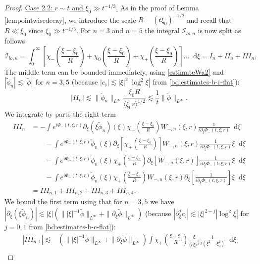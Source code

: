 \documentclass[11 pt]{amsart}
\theoremstyle{definition}
\theoremstyle{remark}
\numberwithin{equation}{section}
\newcommand{\dd}{\mathop{}\!\mathrm{d}}
\begin{document}
\begin{proof}
\noindent \underline{Case 2.2: $r \sim t$ and $\xi_0 \gg t^{-1/3}$.} As in the proof of Lemma \ref{lempointwisedecay}, we introduce the scale $R = (t \xi_0)^{-1/2}$ and recall that $R \ll \xi_0$ since $\xi_0 \gg t^{-1/3}$. For $n=3$ and $n=5$ the integral $\mathcal{I}_{lo,n}$ is now split as follows
\begin{equation} \label{decomposition-mathcalI-lon}
\mathcal{I}_{lo,n} = \int_0^\infty \left[ \chi_-\left( \frac{\xi - \xi_0}{R} \right) + \chi_0\left( \frac{\xi - \xi_0}{R} \right) + \chi_+\left( \frac{\xi - \xi_0}{R} \right)\right] \dots \dd \xi = I_n + II_n + III_n,
\end{equation}
The middle term can be bounded immediately, using \eqref{estimateWa2} and $|\tilde \phi_n|\lesssim |\tilde \phi|$ for $n=3,5$ (because $|c_{\flat}|\lesssim |\xi|^2|\log^2\xi|$ from \eqref{bd:estimates-b-c-flat}):
$$
|II_n| \lesssim  \| \widetilde{\phi}_n \|_{L^\infty} \frac{\xi_0 R}{\langle \xi_0 r \rangle^{1/2}} \lesssim \frac 1t  \|  \widetilde{\phi} \|_{L^\infty} .
$$
We integrate by parts the right-term
\begin{align*}
III_n & = - \int e^{i \Phi_-(t,\xi,r)} \partial_\xi (\xi \widetilde{\phi}_n)(\xi) \chi_+\left( \frac{\xi - \xi_0}{R} \right) W_{-,n}(\xi,r) \frac{1}{i \partial_\xi \Phi_-(t,\xi,r)} \dd \xi \\
&\qquad  - \int e^{i \Phi_-(t,\xi,r)} \widetilde{\phi}_n(\xi)\partial_\xi \left[  \chi_+\left( \frac{\xi - \xi_0}{R} \right) \right] W_{-,n}(\xi,r) \frac{1}{i \partial_\xi \Phi_-(t,\xi,r)} \xi \dd \xi \\
& \qquad -  \int e^{i \Phi_-(t,\xi,r)} \widetilde{\phi}_n(\xi)  \chi_+\left( \frac{\xi - \xi_0}{R} \right) \partial_\xi \left[ W_{-,n}(\xi,r) \right] \frac{1}{i \partial_\xi \Phi_-(t,\xi,r)} \xi \dd \xi \\
& \qquad -  \int e^{i \Phi_-(t,\xi,r)} \widetilde{\phi}_n(\xi) \chi_+\left( \frac{\xi - \xi_0}{R} \right) W_{-,n}(\xi,r) \partial_\xi \left[ \frac{1}{i \partial_\xi \Phi_-(t,\xi,r)} \right] \xi \dd \xi \\
& = III_{n,1} + III_{n,2} + III_{n,3}+III_{n,4}.
\end{align*}
We bound the first term using that for $n=3,5$ we have $|\partial_\xi (\xi \tilde \phi_n)|\lesssim |\xi|(\||\xi|^{-1}\tilde \phi\|_{L^\infty}+\|\partial_\xi \tilde \phi\|_{L^\infty})$ (because $|\partial_\xi^j c_{\flat}|\lesssim |\xi|^{2-j}|\log^2\xi|$ for $j=0,1$ from \eqref{bd:estimates-b-c-flat}):
\begin{align*}
|III_{n,1}| \lesssim &(\||\xi|^{-1}\tilde \phi\|_{L^\infty}+\|\partial_\xi \tilde \phi\|_{L^\infty})  \int  \chi_+\left( \frac{\xi - \xi_0}{R} \right) \frac{\xi}{\langle r \xi \rangle^{\frac 12}}\frac{1}{t(\xi^2-\xi_0^2)} \dd \xi  \\

\end{align*}
\end{proof}
\end{document}
